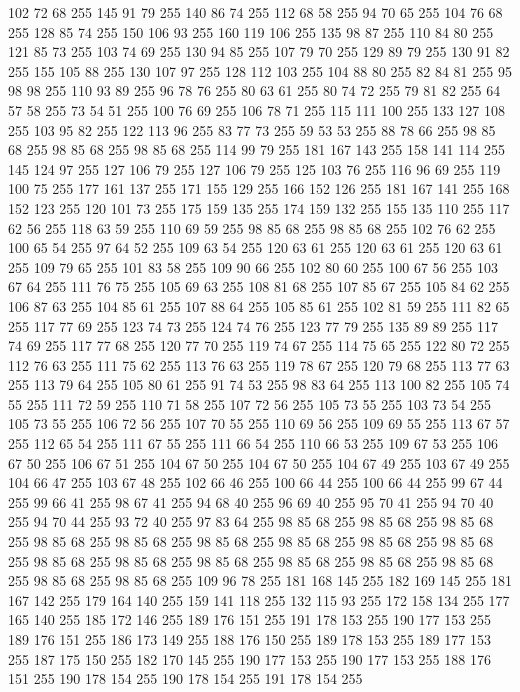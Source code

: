 102 72 68 255 145 91 79 255 140 86 74 255 112 68 58 255 94 70 65 255 104 76 68 255 128 85 74 255 150 106 93 255 160 119 106 255 135 98 87 255 110 84 80 255 121 85 73 255 103 74 69 255 130 94 85 255 107 79 70 255 129 89 79 255 130 91 82 255 155 105 88 255 130 107 97 255 128 112 103 255 104 88 80 255 82 84 81 255 95 98 98 255 110 93 89 255 96 78 76 255 80 63 61 255 80 74 72 255 79 81 82 255 64 57 58 255 73 54 51 255 100 76 69 255 106 78 71 255 115 111 100 255 133 127 108 255 103 95 82 255 122 113 96 255 83 77 73 255 59 53 53 255 88 78 66 255 98 85 68 255 98 85 68 255 98 85 68 255 114 99 79 255 181 167 143 255 158 141 114 255 145 124 97 255 127 106 79 255 127 106 79 255 125 103 76 255 116 96 69 255 119 100 75 255 177 161 137 255 171 155 129 255 166 152 126 255 181 167 141 255 168 152 123 255 120 101 73 255 175 159 135 255 174 159 132 255 155 135 110 255 117 62 56 255 118 63 59 255 110 69 59 255 98 85 68 255
98 85 68 255 102 76 62 255 100 65 54 255 97 64 52 255 109 63 54 255 120 63 61 255 120 63 61 255 120 63 61 255 109 79 65 255 101 83 58 255 109 90 66 255 102 80 60 255 100 67 56 255 103 67 64 255 111 76 75 255 105 69 63 255 108 81 68 255 107 85 67 255 105 84 62 255 106 87 63 255 104 85 61 255 107 88 64 255 105 85 61 255 102 81 59 255 111 82 65 255 117 77 69 255 123 74 73 255 124 74 76 255 123 77 79 255 135 89 89 255 117 74 69 255 117 77 68 255 120 77 70 255 119 74 67 255 114 75 65 255 122 80 72 255 112 76 63 255 111 75 62 255 113 76 63 255 119 78 67 255 120 79 68 255 113 77 63 255 113 79 64 255 105 80 61 255 91 74 53 255 98 83 64 255 113 100 82 255 105 74 55 255 111 72 59 255 110 71 58 255 107 72 56 255 105 73 55 255 103 73 54 255 105 73 55 255 106 72 56 255 107 70 55 255 110 69 56 255 109 69 55 255 113 67 57 255 112 65 54 255 111 67 55 255 111 66 54 255 110 66 53 255 109 67 53 255
106 67 50 255 106 67 51 255 104 67 50 255 104 67 50 255 104 67 49 255 103 67 49 255 104 66 47 255 103 67 48 255 102 66 46 255 100 66 44 255 100 66 44 255 99 67 44 255 99 66 41 255 98 67 41 255 94 68 40 255 96 69 40 255 95 70 41 255 94 70 40 255 94 70 44 255 93 72 40 255 97 83 64 255 98 85 68 255 98 85 68 255 98 85 68 255 98 85 68 255 98 85 68 255 98 85 68 255 98 85 68 255 98 85 68 255 98 85 68 255 98 85 68 255 98 85 68 255 98 85 68 255 98 85 68 255 98 85 68 255 98 85 68 255 98 85 68 255 98 85 68 255 109 96 78 255 181 168 145 255 182 169 145 255 181 167 142 255 179 164 140 255 159 141 118 255 132 115 93 255 172 158 134 255 177 165 140 255 185 172 146 255 189 176 151 255 191 178 153 255 190 177 153 255 189 176 151 255 186 173 149 255 188 176 150 255 189 178 153 255 189 177 153 255 187 175 150 255 182 170 145 255 190 177 153 255 190 177 153 255 188 176 151 255 190 178 154 255 190 178 154 255 191 178 154 255
